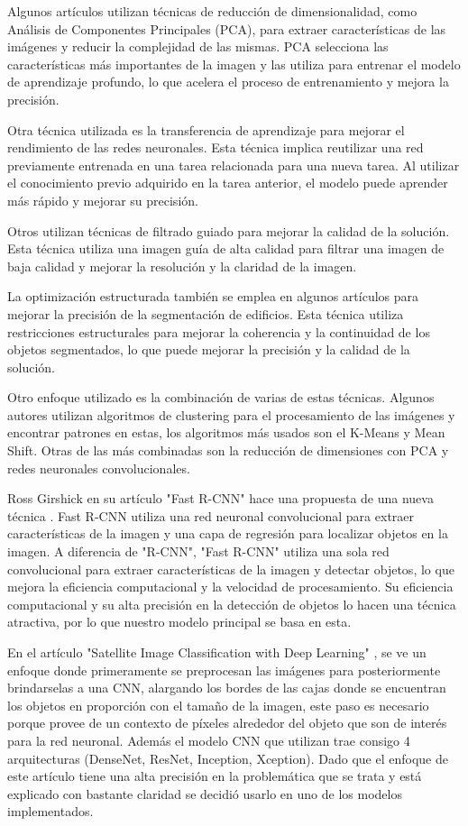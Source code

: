 \documentclass[article]{llncs}
\begin{document}
Algunos artículos utilizan técnicas de reducción de dimensionalidad, como Análisis de Componentes Principales 
(PCA), para extraer características de las imágenes y reducir la complejidad de las mismas. PCA selecciona las 
características más importantes de la imagen y las utiliza para entrenar el modelo de aprendizaje profundo, lo que 
acelera el proceso de entrenamiento y mejora la precisión.

Otra técnica utilizada es la transferencia de aprendizaje para mejorar el rendimiento de las redes neuronales. Esta 
técnica implica reutilizar una red previamente entrenada en una tarea relacionada para una nueva tarea. 
Al utilizar el conocimiento previo adquirido en la tarea anterior, el modelo puede aprender más rápido y mejorar 
su precisión.

Otros utilizan técnicas de filtrado guiado para mejorar la calidad de la solución. Esta técnica utiliza una 
imagen guía de alta calidad para filtrar una imagen de baja calidad y mejorar la resolución y la claridad de la imagen.

La optimización estructurada también se emplea en algunos artículos para mejorar la precisión de la segmentación de 
edificios. Esta técnica utiliza restricciones estructurales para mejorar la coherencia y la continuidad de los 
objetos segmentados, lo que puede mejorar la precisión y la calidad de la solución.

Otro enfoque utilizado es la combinación de varias de estas técnicas. Algunos autores utilizan algoritmos de clustering 
para el procesamiento de las imágenes y encontrar patrones en estas, los algoritmos más usados son el K-Means y Mean Shift. Otras de las más combinadas 
son la reducción de dimensiones con PCA y redes neuronales convolucionales.

Ross Girshick en su artículo "Fast R-CNN" hace una propuesta de una nueva técnica \cite{FRCNN}. Fast R-CNN utiliza una red neuronal 
convolucional para extraer características de la imagen y una capa de regresión para localizar objetos en la imagen. 
A diferencia de "R-CNN", "Fast R-CNN" utiliza una sola red convolucional para extraer características de la imagen y 
detectar objetos, lo que mejora la eficiencia computacional y la velocidad de procesamiento. Su eficiencia computacional y su alta precisión en la detección de objetos 
lo hacen una técnica atractiva, por lo que nuestro modelo principal se basa en esta. 

En el artículo "Satellite Image Classification with Deep Learning" \cite{satelite}, se ve un enfoque donde primeramente se 
preprocesan las imágenes para posteriormente brindarselas a una CNN, alargando los bordes de las cajas donde se encuentran los objetos en proporción con el tamaño de 
la imagen, este paso es necesario porque provee de un contexto de píxeles alrededor del objeto que son de interés para la red 
neuronal. Además el modelo CNN que utilizan trae consigo 4 arquitecturas (DenseNet, ResNet, Inception, Xception). 
Dado que el enfoque de este artículo tiene una alta precisión en la problemática que se trata y está explicado con bastante claridad 
se decidió usarlo en uno de los modelos implementados.
\end{document}
